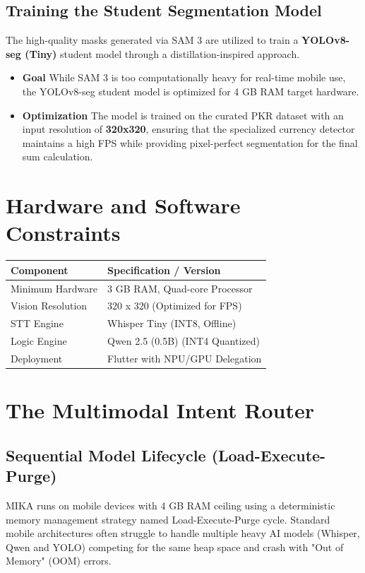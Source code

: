 \documentclass[12pt,a4paper]{report}
\begin{document}
\subsection{Training the Student Segmentation Model}
The high-quality masks generated via SAM 3 are utilized to train a \textbf{YOLOv8-seg (Tiny)} student model through a distillation-inspired approach.
 
\begin{itemize}
    \item[1.] \textbf{Goal} While SAM 3 is too computationally heavy for real-time mobile use, the YOLOv8-seg student model is optimized for 4 GB RAM target hardware.
    \item[2.] \textbf{Optimization} The model is trained on the curated PKR dataset with an input resolution of \textbf{320x320}, ensuring that the specialized currency detector maintains a high FPS while providing pixel-perfect segmentation for the final sum calculation.
\end{itemize}
 
\section{Hardware and Software Constraints}
 
\begin{table}[h]
\centering
\small
\begin{tabularx}{\textwidth}{l X}
\toprule
\textbf{Component} & \textbf{Specification / Version} \\
\midrule
Minimum Hardware & 3 GB RAM, Quad-core Processor \\
Vision Resolution & 320 x 320 (Optimized for FPS) \\
STT Engine & Whisper Tiny (INT8, Offline) \\
Logic Engine & Qwen 2.5 (0.5B) (INT4 Quantized) \\
Deployment & Flutter with NPU/GPU Delegation \\
\bottomrule
\end{tabularx}
\end{table}
 
\section{The Multimodal Intent Router}
\subsection{Sequential Model Lifecycle (Load-Execute-Purge)}
MIKA runs on mobile devices with 4 GB RAM ceiling using a deterministic memory management strategy named Load-Execute-Purge cycle. Standard mobile architectures often struggle to handle multiple heavy AI models (Whisper, Qwen and YOLO) competing for the same heap space and crash with "Out of Memory" (OOM) errors.
 
\end{document}
